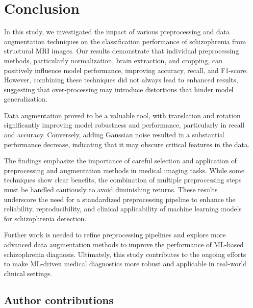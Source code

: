 \section{Conclusion}

In this study, we investigated the impact of various preprocessing and data augmentation techniques on the classification performance of schizophrenia from structural MRI images. Our results demonstrate that individual preprocessing methods, particularly normalization, brain extraction, and cropping, can positively influence model performance, improving accuracy, recall, and F1-score. However, combining these techniques did not always lead to enhanced results, suggesting that over-processing may introduce distortions that hinder model generalization.

Data augmentation proved to be a valuable tool, with translation and rotation significantly improving model robustness and performance, particularly in recall and accuracy. Conversely, adding Gaussian noise resulted in a substantial performance decrease, indicating that it may obscure critical features in the data.

The findings emphasize the importance of careful selection and application of preprocessing and augmentation methods in medical imaging tasks. While some techniques show clear benefits, the combination of multiple preprocessing steps must be handled cautiously to avoid diminishing returns. These results underscore the need for a standardized preprocessing pipeline to enhance the reliability, reproducibility, and clinical applicability of machine learning models for schizophrenia detection.

Further work is needed to refine preprocessing pipelines and explore more advanced data augmentation methods to improve the performance of ML-based schizophrenia diagnosis. Ultimately, this study contributes to the ongoing efforts to make ML-driven medical diagnostics more robust and applicable in real-world clinical settings.



\subsection*{Author contributions}

